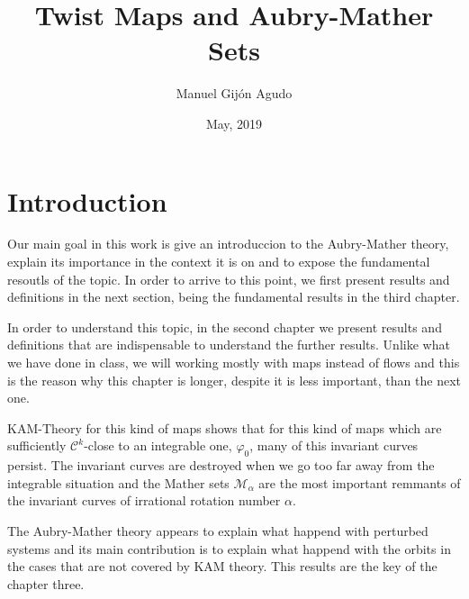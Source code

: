 \documentclass{article}
\title{Twist Maps and Aubry-Mather Sets}
\author{Manuel Gijón Agudo }
\date{May, 2019}
\begin{document}
	\begin{titlepage}
		\maketitle{} 
	\end{titlepage}
	
	\newpage
	\tableofcontents
	\newpage
	

\section{Introduction}

	
	
	


		
	Our main goal in this work is give an introduccion to the Aubry-Mather theory, explain its importance in the context it is on and to expose the fundamental resoutls of the topic. In order to arrive to this point, we first present results and definitions in the next section, being the fundamental results in the third chapter.
	
	\noindent In order to understand this topic, in the second chapter we present results and definitions that are indispensable to understand the further results. Unlike what we have done in class, we will working mostly with maps instead of flows and this is the reason why this chapter is longer, despite it is less important, than the next one.
	
\noindent KAM-Theory for this kind of maps shows that for this kind of maps which are sufficiently $\mathcal{C}^{k}$-close to an integrable one, $\varphi_0$, many of this invariant curves persist. The invariant curves are destroyed when we go too far away from the integrable situation and the Mather sets $\mathcal{M}_{\alpha}$ are the most important remmants of the invariant curves of irrational rotation number $\alpha$.

	\noindent The Aubry-Mather theory appears to explain what happend with perturbed systems and its main contribution is to explain what happend with the orbits in the cases that are not covered by KAM theory. This results are the key of the chapter three.  
	
\end{document}
